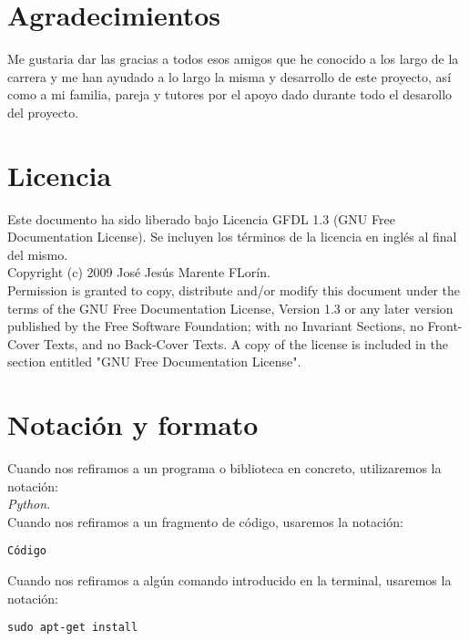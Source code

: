 

\section*{Agradecimientos}

Me gustaria dar las gracias a todos esos amigos que he conocido a los largo de la carrera y me han ayudado
a lo largo la misma y desarrollo de este proyecto, así como a mi familia, pareja y tutores por el apoyo 
dado durante todo el desarollo del proyecto.

\cleardoublepage

\section*{Licencia} %

Este documento ha sido liberado bajo Licencia GFDL 1.3 (GNU Free
Documentation License). Se incluyen los términos de la licencia en
inglés al final del mismo.\\

Copyright (c) 2009 José Jesús Marente FLorín.\\

Permission is granted to copy, distribute and/or modify this document under the
terms of the GNU Free Documentation License, Version 1.3 or any later version
published by the Free Software Foundation; with no Invariant Sections, no
Front-Cover Texts, and no Back-Cover Texts. A copy of the license is included in
the section entitled "GNU Free Documentation License".\\

\cleardoublepage

\section*{Notación y formato}

Cuando nos refiramos a un programa o biblioteca en concreto, utilizaremos la
notación:\\

\emph{Python}.\\

Cuando nos refiramos a un fragmento de código, usaremos la notación:
\begin{verbatim} 
Código 
\end{verbatim}

Cuando nos refiramos a algún comando introducido en la terminal, usaremos la notación:

\begin{lstlisting}[style=consola, numbers=none]
sudo apt-get install
\end{lstlisting}
